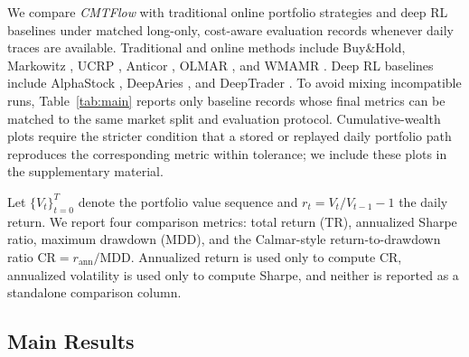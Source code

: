 \documentclass[letterpaper]{article} %
\begin{document}
We compare \textit{CMTFlow} with traditional online portfolio strategies and deep RL baselines under matched long-only, cost-aware evaluation records whenever daily traces are available. Traditional and online methods include Buy\&Hold, Markowitz \citep{MVO}, UCRP \citep{UCRP}, Anticor \citep{ANTICOR}, OLMAR \citep{OLMAR}, and WMAMR \citep{WMAMR}. Deep RL baselines include AlphaStock \citep{alphastock}, DeepAries \citep{deeparies2025}, and DeepTrader \citep{6}. To avoid mixing incompatible runs, Table~\ref{tab:main} reports only baseline records whose final metrics can be matched to the same market split and evaluation protocol. Cumulative-wealth plots require the stricter condition that a stored or replayed daily portfolio path reproduces the corresponding metric within tolerance; we include these plots in the supplementary material.

Let \(\{V_t\}_{t=0}^{T}\) denote the portfolio value sequence and \(r_t=V_t/V_{t-1}-1\) the daily return. We report four comparison metrics: total return (TR), annualized Sharpe ratio, maximum drawdown (MDD), and the Calmar-style return-to-drawdown ratio \(\mathrm{CR}=r_{\mathrm{ann}}/\mathrm{MDD}\). Annualized return is used only to compute CR, annualized volatility is used only to compute Sharpe, and neither is reported as a standalone comparison column.

\subsection{Main Results}
\end{document}
